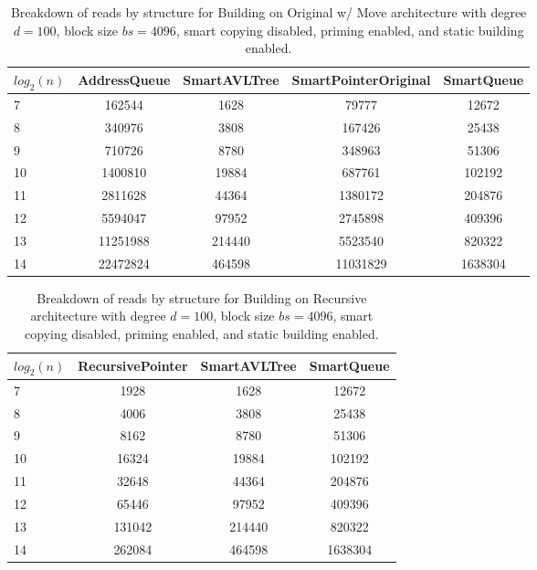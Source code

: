 \begin{table}[]
\centering
\begin{tabular}{|l|c|c|c|c|}
$log_2(n)$ & AddressQueue & SmartAVLTree & SmartPointerOriginal & SmartQueue \\ \hline
7 & 162544 & 1628 & 79777 & 12672 \\ \hline
8 & 340976 & 3808 & 167426 & 25438 \\ \hline
9 & 710726 & 8780 & 348963 & 51306 \\ \hline
10 & 1400810 & 19884 & 687761 & 102192 \\ \hline
11 & 2811628 & 44364 & 1380172 & 204876 \\ \hline
12 & 5594047 & 97952 & 2745898 & 409396 \\ \hline
13 & 11251988 & 214440 & 5523540 & 820322 \\ \hline
14 & 22472824 & 464598 & 11031829 & 1638304 \\ \hline
\end{tabular}
\caption{Breakdown of reads by structure for Building on Original w/ Move architecture with degree $d=100$, block size $bs=4096$, smart copying disabled, priming enabled, and static building enabled.}
    \label{tab:reads_by_structure_build_d100_bs4096_copiesfalse_primetrue_staticinsertiontrue_ptoriginal_movetrue}
\end{table}

\begin{table}[]
\centering
\begin{tabular}{|l|c|c|c|}
$log_2(n)$ & RecursivePointer & SmartAVLTree & SmartQueue \\ \hline
7 & 1928 & 1628 & 12672 \\ \hline
8 & 4006 & 3808 & 25438 \\ \hline
9 & 8162 & 8780 & 51306 \\ \hline
10 & 16324 & 19884 & 102192 \\ \hline
11 & 32648 & 44364 & 204876 \\ \hline
12 & 65446 & 97952 & 409396 \\ \hline
13 & 131042 & 214440 & 820322 \\ \hline
14 & 262084 & 464598 & 1638304 \\ \hline
\end{tabular}
\caption{Breakdown of reads by structure for Building on Recursive architecture with degree $d=100$, block size $bs=4096$, smart copying disabled, priming enabled, and static building enabled.}
    \label{tab:reads_by_structure_build_d100_bs4096_copiesfalse_primetrue_staticinsertiontrue_ptrecursive_movetrue}
\end{table}

